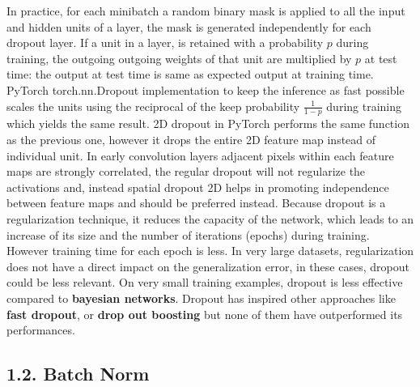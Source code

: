 \documentclass[11pt]{article}
\newcommand{\0}{\mat{0}}
\begin{document}
\begin{itemize}
In practice, for each minibatch a random binary mask is applied to all the input and hidden units of a layer, the mask is generated independently for each dropout layer. If a unit in a layer, is retained with a probability $p$ during training, the outgoing outgoing weights of that unit are multiplied by $p$ at test time: the output at test time is same as expected output at training time.\\ PyTorch torch.nn.Dropout implementation to keep the inference as fast possible scales the units using the reciprocal of the keep probability $\frac{1}{1-p}$ during training which yields the same result. 2D dropout in PyTorch performs the same function as the previous one, however it drops the entire 2D feature map instead of individual unit. In early convolution layers adjacent pixels within each feature maps are strongly correlated, the regular dropout will not regularize the activations and, instead spatial dropout 2D helps in promoting independence between feature maps and should be preferred instead. Because dropout is a regularization technique, it reduces the capacity of the network, which leads to an increase of its size and the number of iterations (epochs) during training. However training time for each epoch is less. In very large datasets, regularization does not have a direct impact on the generalization error, in these cases, dropout could be less relevant. On very small training examples, dropout is less effective compared to \textbf{bayesian networks}. Dropout has inspired other approaches like \textbf{fast dropout}, or \textbf{drop out boosting} but none of them have outperformed its performances.
 

\end{itemize}
\subsection*{1.2. Batch Norm}
\end{document}
